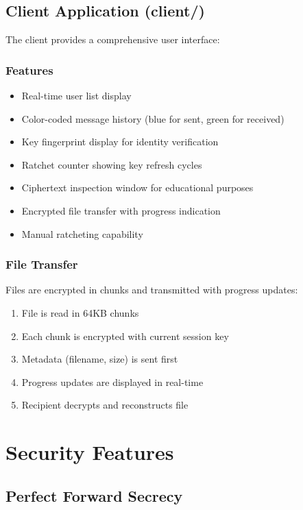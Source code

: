 \documentclass[12pt,a4paper]{article}
\begin{document}
\subsection{Client Application (client/)}

The client provides a comprehensive user interface:

\subsubsection{Features}
\begin{itemize}
    \item Real-time user list display
    \item Color-coded message history (blue for sent, green for received)
    \item Key fingerprint display for identity verification
    \item Ratchet counter showing key refresh cycles
    \item Ciphertext inspection window for educational purposes
    \item Encrypted file transfer with progress indication
    \item Manual ratcheting capability
\end{itemize}

\subsubsection{File Transfer}
Files are encrypted in chunks and transmitted with progress updates:

\begin{enumerate}
    \item File is read in 64KB chunks
    \item Each chunk is encrypted with current session key
    \item Metadata (filename, size) is sent first
    \item Progress updates are displayed in real-time
    \item Recipient decrypts and reconstructs file
\end{enumerate}

\section{Security Features}

\subsection{Perfect Forward Secrecy}
\end{document}
